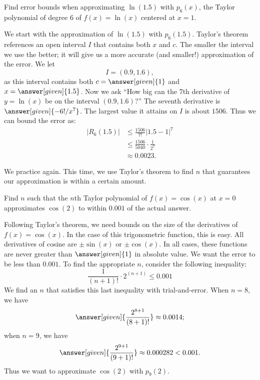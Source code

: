 \documentclass{ximera}
\begin{document}
\begin{example}
Find error bounds when approximating $\ln(1.5)$ with $p_6(x)$, the
Taylor polynomial of degree $6$ of $f(x)=\ln(x)$ centered at $x=1$.
\begin{explanation}
We start with the approximation of $\ln(1.5)$ with $p_6(1.5)$. Taylor's
theorem references an open interval $I$ that contains both $x$ and
$c$. The smaller the interval we use the better; it will give us a
more accurate (and smaller!) approximation of the error. We let
\[
I =(0.9,1.6),
\]
as this interval contains both $c=\answer[given]{1}$ and
$x=\answer[given]{1.5}$.  Now we ask ``How big can the $7$th
derivative of $y=\ln(x)$ be on the interval $(0.9,1.6)$?'' The seventh
derivative is $\answer[given]{-6!/x^7}$. The largest value it attains on $I$ is about
$1506$. Thus we can bound the error as:
\begin{align*}
|R_6(1.5)| &\leq \frac{1506}{7!}|1.5-1|^7\\
&\leq \frac{1506}{5040}\cdot\frac1{2^7}\\
&\approx 0.0023.
\end{align*}
\end{explanation}
\end{example}

  
We practice again. This time, we use Taylor's theorem to find $n$ that
guarantees our approximation is within a certain amount.

\begin{example}
  Find $n$ such that the $n$th Taylor polynomial of $f(x)=\cos(x)$ at
  $x=0$ approximates $\cos(2)$ to within $0.001$ of the actual
  answer.
\begin{explanation}
  Following Taylor's theorem, we need bounds on the size of the
  derivatives of $f(x)=\cos(x)$. In the case of this trigonometric
  function, this is easy. All derivatives of cosine are $\pm \sin(x)$
  or $\pm \cos(x)$. In all cases, these functions are never greater
  than $\answer[given]{1}$ in absolute value. We want the error to be
  less than $0.001$. To find the appropriate $n$, consider the
  following inequality:
  \[
  \frac{1}{(n+1)!}\cdot2^{(n+1)} \leq 0.001
  \]
We find an $n$ that satisfies this last inequality with trial-and-error. When $n=8$, we have
\[
\answer[given]{\frac{2^{8+1}}{(8+1)!}} \approx 0.0014;
\]
when $n=9$, we have
\[
\answer[given]{\frac{2^{9+1}}{(9+1)!}} \approx 0.000282 <0.001.
\]
Thus we want to approximate $\cos(2)$ with $p_9(2)$.
\end{explanation}
\end{example}
\end{document}
